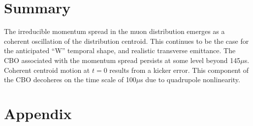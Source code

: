 \documentclass[10pt]{article}
\begin{document}
\section{Summary}
The irreducible momentum spread in the muon distribution emerges as a coherent oscillation of the distribution centroid.  This continues to 
be the case for the anticipated ``W'' temporal shape, and realistic transverse emittance. The CBO associated with the momentum
spread persists at some level beyond 145$\mu$s. Coherent centroid motion at $t=0$ results from a kicker error. This component of the
CBO decoheres on the time scale of 100$\mu$s due to quadrupole nonlinearity. 

\newpage
\section{Appendix}
\end{document}
